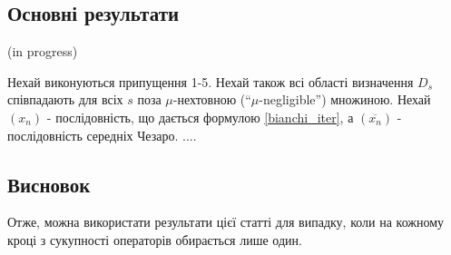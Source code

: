 \documentclass[main.tex]{subfile}
\begin{document}
	\subsection{Основні результати}
	{\color{red} (in progress)}
	\theoremstyle{corrolary}
	\begin{theorem}
		Нехай виконуються припущення 1-5. Нехай також всі області визначення $D_s$ співпадають для всіх $s$ поза $\mu$-нехтовною (``$\mu$-negligible'') множиною. Нехай $(x_n)$ - послідовність, що дається формулою \ref{bianchi_iter}, а $(\overline{x_n})$ - послідовність середніх Чезаро. .... $ $
	\end{theorem}
    \subsection{Висновок} 
    
    
    Отже, можна використати результати цієї статті для випадку, коли на кожному кроці з сукупності операторів обирається лише один.
\end{document}
